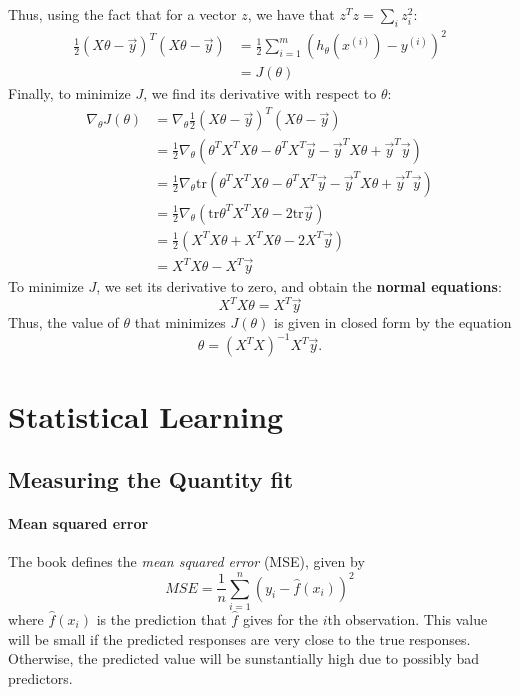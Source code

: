 \documentclass{article}
\begin{document}
Thus, using the fact that for a vector $z$, we have that $z^Tz = \sum_{i}z_i^2$:
\begin{align*}
	\frac{1}{2}\left(X\theta - \vec{y}\right)^T\left(X\theta - \vec{y}\right) &= \frac{1}{2} \sum_{i=1}^{m}\left(h_\theta(x^{(i)}) - y^{(i)}\right)^2 \\
	&= J(\theta)
\end{align*}
Finally, to minimize $J$, we find its derivative with respect to $\theta$:
\begin{align*}
	\nabla_\theta J(\theta) &= \nabla_\theta \frac{1}{2}\left(X\theta - \vec{y}\right)^T\left(X\theta - \vec{y}\right) \\
	&= \frac{1}{2} \nabla_\theta \left( \theta^TX^TX\theta - \theta^TX^T\vec{y} - \vec{y}^TX\theta + \vec{y}^T\vec{y} \right) \\
	&= \frac{1}{2} \nabla_\theta \text{tr} \left( \theta^TX^TX\theta - \theta^TX^T\vec{y} - \vec{y}^TX\theta + \vec{y}^T\vec{y} \right) \\
	&= \frac{1}{2} \nabla_\theta \left( \text{tr} \theta^TX^TX\theta -2\text{tr}\vec{y}\right) \\
	&= \frac{1}{2} \left(X^TX\theta + X^TX\theta - 2X^T\vec{y}\right) \\
	&= X^TX\theta - X^T\vec{y}
\end{align*}
To minimize $J$, we set its derivative to zero, and obtain the {\bf normal equations}:
\begin{equation}
	\label{eq:normal_equation}
	X^TX\theta = X^T\vec{y}
\end{equation}
Thus, the value of $\theta$ that minimizes $J(\theta)$ is given in closed form by the equation
\begin{equation}
	\theta = (X^TX)^{-1}X^T\vec{y}.
\end{equation}

\section{Statistical Learning}
\subsection{Measuring the Quantity fit}

\paragraph{Mean squared error}
The book defines the \textit{mean squared error} (MSE), given by
\[
	MSE = \frac{1}{n}\sum_{i=1}^{n}\left(y_i - \hat{f}(x_i)\right)^2
\]
where $\hat{f}(x_i)$ is the prediction that $\hat{f}$ gives for the $i$th observation. This value will be small if the predicted responses are very close to the true responses. Otherwise, the predicted value will be sunstantially high due to possibly bad predictors.
\end{document}
